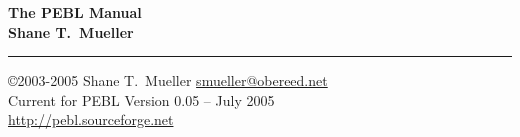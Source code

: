 \documentclass[a4paper,11pt]{report}
\begin{document}
\begin{center}
\LARGE
\textbf{The PEBL Manual} \\
\vspace{0.7cm}\Large \textbf{Shane T.~Mueller}
\end{center}
\rule{\textwidth}{1mm}


\vspace{.4cm}
\normalsize
\noindent\copyright 2003-2005 Shane T.~Mueller \href{mailto:smueller@obereed.net}{smueller@obereed.net}\\
Current for PEBL Version 0.05 -- July 2005 \\
\href{http://pebl.sourceforge.net}{http://pebl.sourceforge.net}
\tableofcontents

\clearpage
{}








\appendix
%


%
%
\end{document}
